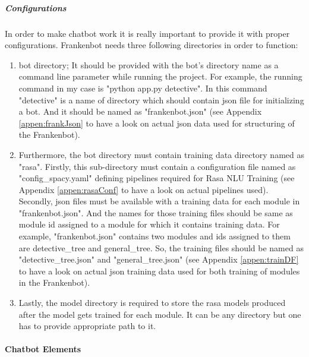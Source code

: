 \subparagraph*{Configurations \label{par:config}}
In order to make chatbot work it is really important to provide it with proper configurations. Frankenbot needs three following directories in order to function:
\begin{enumerate}
    \item bot directory; It should be provided with the bot's directory name as a command line parameter while running the project. For example, the running command in my case is "python app.py detective". In this command "detective" is a name of directory which should contain json file for initializing a bot. And it should be named as "frankenbot.json" (see Appendix \ref{appen:frankJson} to have a look on actual json data used for structuring of the Frankenbot). 
    \item Furthermore, the bot directory must contain training data directory named as "rasa". Firstly, this sub-directory must contain a configuration file named as "config\_spacy.yaml" defining pipelines required for Rasa NLU Training\cite{rasapipeline} (see Appendix \ref{appen:rasaConf} to have a look on actual pipelines used). Secondly, json files must be available with a training data for each module in "frankenbot.json". And the names for those training files should be same as module id assigned to a module for which it contains training data. For example, "frankenbot.json" contains two modules and ids assigned to them are detective\_tree and general\_tree. So, the training files should be named as "detective\_tree.json" and "general\_tree.json" (see Appendix \ref{appen:trainDF} to have a look on actual json training data used for both training of modules in the Frankenbot).
    \item Lastly, the model directory is required to store the rasa models produced after the model gets trained for each module. It can be any directory but one has to provide appropriate path to it.
\end{enumerate} 

\paragraph*{Chatbot Elements}

